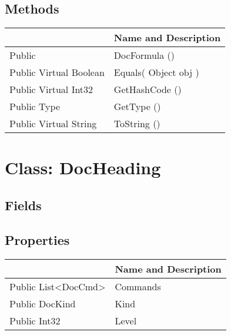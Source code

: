 \documentclass[11pt, oneside, a4paper]{book}
\begin{document}
\subsection{Methods}
\begin{center}
\begin{tabular}{| p{3cm} | p{12cm} | }
\hline
\textbf{ } & \textbf{ Name and Description}\\
\hline
 Public  &  DocFormula ()\hypertarget{SoftwareEngineeringTools.{}Documentation.{}DocFormula.{}DocFormula}{}\\
\hline
 Public  Virtual  Boolean &  Equals(\hypertarget{SoftwareEngineeringTools.{}Documentation.{}DocFormula.{}Equals\_Object}{} Object  obj  )\\
\hline
 Public  Virtual  Int32 &  GetHashCode ()\hypertarget{SoftwareEngineeringTools.{}Documentation.{}DocFormula.{}GetHashCode}{}\\
\hline
 Public  Type &  GetType ()\hypertarget{SoftwareEngineeringTools.{}Documentation.{}DocFormula.{}GetType}{}\\
\hline
 Public  Virtual  String &  ToString ()\hypertarget{SoftwareEngineeringTools.{}Documentation.{}DocFormula.{}ToString}{}\\
\hline
\end{tabular}
\end{center}
 


\hypertarget{SoftwareEngineeringTools.{}Documentation.{}DocHeading}{}
\section{Class: DocHeading}

\subsection{Fields}

\subsection{Properties}
\begin{center}
\begin{tabular}{| p{3cm} | p{12cm} | }
\hline
\textbf{ } & \textbf{ Name and Description}\\
\hline
 Public  List<DocCmd> &  Commands\hypertarget{SoftwareEngineeringTools.{}Documentation.{}DocHeading.{}Commands}{}\\
\hline
 Public  DocKind &  Kind\hypertarget{SoftwareEngineeringTools.{}Documentation.{}DocHeading.{}Kind}{}\\
\hline
 Public  Int32 &  Level\hypertarget{SoftwareEngineeringTools.{}Documentation.{}DocHeading.{}Level}{}\\
\hline
\end{tabular}
\end{center}
\end{document}
